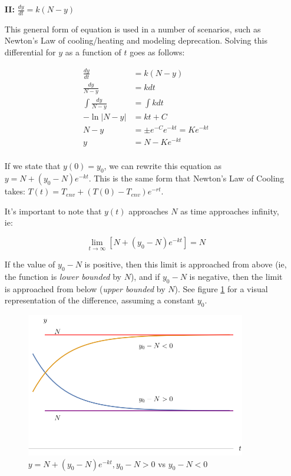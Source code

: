 \documentclass[12pt]{article}
\begin{document}
\begin{itemize}
    \item[\textbf{II:}] $\frac{dy}{dt} = k(N-y)$ 
    
    This general form of equation is used in a number of scenarios, such as Newton's Law of cooling/heating and modeling deprecation. Solving this differential for $y$ as a function of $t$ goes as follows:
    
    \begin{equation}
        \begin{split}
            \frac{dy}{dt} &= k(N-y)\\
            \frac{dy}{N-y} &= k dt  \\
            \int \frac{dy}{N-y} &= \int k dt\\
            - \ln|N-y| &= kt + C\\
            N-y &= \pm e^{-C}e^{-kt} = Ke^{-kt}\\
            y &= N-Ke^{-kt}\\
        \end{split}
    \end{equation}
    
    If we state that $y(0) = y_0$, we can rewrite this equation as $y = N+(y_0-N)e^{-kt}$. This is the same form that Newton's Law of Cooling takes: $T(t) = T_{env} + (T(0) - T_{env})e^{-rt}$.
    
    It's important to note that $y(t)$ approaches $N$ as time approaches infinity, ie:
    
    $$\lim_{t\to\infty} [N+(y_0-N)e^{-kt}] = N$$
    
    If the value of $y_0-N$ is positive, then this limit is approached from above (ie, the function is \textit{lower bounded} by $N$), and if $y_0-N$ is negative, then the limit is approached from below (\textit{upper bounded} by $N$). See figure \ref{fig:newtonscooling} for a visual representation of the difference, assuming a constant $y_0$.
    
    \begin{figure}[!ht]
        \centering
        \includegraphics[width=9.6cm]{misc/newtonscooling.png}
        \caption{$y=N+(y_0-N)e^{-kt}, y_0-N > 0$ vs $y_0-N < 0$}
        \label{fig:newtonscooling}
    \end{figure}
    

\end{itemize}
\end{document}
